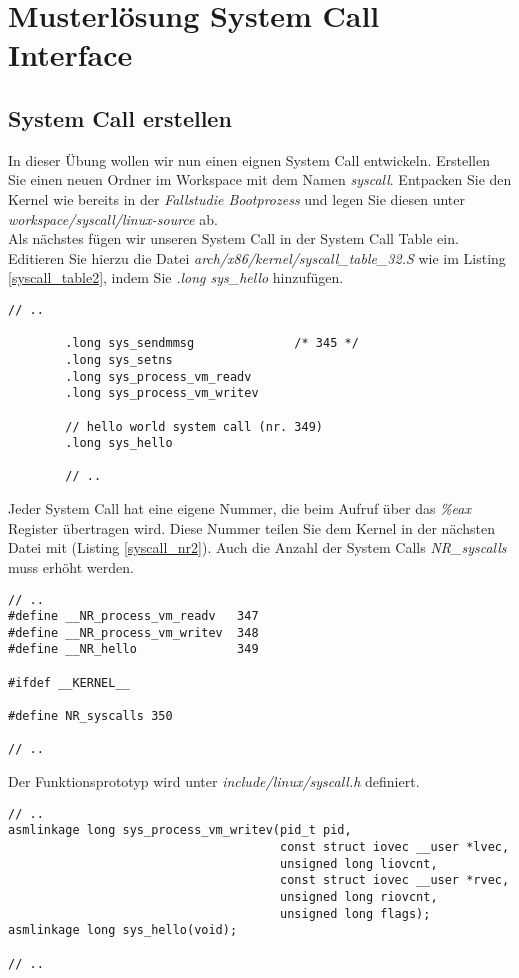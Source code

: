 \section{Musterlösung System Call Interface}

\subsection{System Call erstellen}

In dieser Übung wollen wir nun einen eignen System Call entwickeln. Erstellen Sie einen neuen Ordner im 
Workspace mit dem Namen \emph{syscall}. Entpacken Sie den Kernel wie bereits in der \emph{Fallstudie Bootprozess}
und legen Sie diesen unter \emph{workspace/syscall/linux-source} ab. \\

Als nächstes fügen wir unseren System Call in der System Call Table ein. Editieren Sie hierzu die Datei
\emph{arch/x86/kernel/syscall\_table\_32.S} wie im Listing \ref{syscall_table2}, indem Sie \emph{.long sys\_hello}
hinzufügen. 

\begin{lstlisting}[label=syscall_table2,caption=arch/x86/kernel/syscall\_table\_32.S]
        // ..

        .long sys_sendmmsg              /* 345 */
        .long sys_setns
        .long sys_process_vm_readv
        .long sys_process_vm_writev

        // hello world system call (nr. 349)
        .long sys_hello

        // ..
\end{lstlisting} \hfill

Jeder System Call hat eine eigene Nummer, die beim Aufruf über das \emph{\%eax} Register übertragen wird. Diese Nummer
teilen Sie dem Kernel in der nächsten Datei mit (Listing \ref{syscall_nr2}). Auch die Anzahl der System Calls \emph{NR\_syscalls}
muss erhöht werden.

\begin{lstlisting}[label=syscall_nr2,caption=arch/x86/include/asm/unistd\_32.S]
// ..
#define __NR_process_vm_readv   347
#define __NR_process_vm_writev  348
#define __NR_hello              349

#ifdef __KERNEL__

#define NR_syscalls 350

// ..
\end{lstlisting} \hfill


Der Funktionsprototyp wird unter \emph{include/linux/syscall.h} definiert.
\begin{lstlisting}[caption=include/linux/syscall.h]
// ..
asmlinkage long sys_process_vm_writev(pid_t pid,
                                      const struct iovec __user *lvec,
                                      unsigned long liovcnt,
                                      const struct iovec __user *rvec,
                                      unsigned long riovcnt,
                                      unsigned long flags);
asmlinkage long sys_hello(void);

// ..
\end{lstlisting} \hfill

